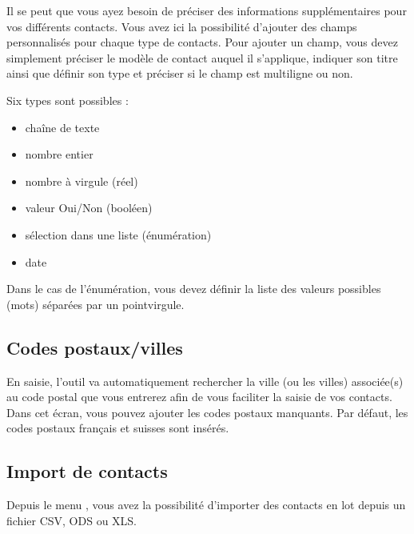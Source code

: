 \documentclass[letterpaper,10pt,french]{sphinxmanual}
\begin{document}
\sphinxAtStartPar
Il se peut que vous ayez besoin de préciser des informations supplémentaires pour vos différents contacts. Vous avez ici la possibilité d’ajouter des champs personnalisés pour chaque type de contacts. Pour ajouter un champ, vous devez simplement préciser le modèle de contact auquel il s’applique, indiquer son titre ainsi que définir son type et préciser si le champ est multiligne ou non.

\sphinxAtStartPar
Six types sont possibles :
\begin{itemize}
\item {} 
\sphinxAtStartPar
chaîne de texte

\item {} 
\sphinxAtStartPar
nombre entier

\item {} 
\sphinxAtStartPar
nombre à virgule (réel)

\item {} 
\sphinxAtStartPar
valeur Oui/Non (booléen)

\item {} 
\sphinxAtStartPar
sélection dans une liste (énumération)

\item {} 
\sphinxAtStartPar
date

\end{itemize}

\sphinxAtStartPar
Dans le cas de l’énumération, vous devez définir la liste des valeurs possibles (mots) séparées par un point\sphinxhyphen{}virgule.


\subsection{Codes postaux/villes}
\label{\detokenize{contacts/configuration:codes-postaux-villes}}
\sphinxAtStartPar
En saisie, l’outil va automatiquement rechercher la ville (ou les villes) associée(s) au code postal que vous entrerez afin de vous faciliter la saisie de vos contacts.
Dans cet écran, vous pouvez ajouter les codes postaux manquants.
Par défaut, les codes postaux français et suisses sont insérés.


\subsection{Import de contacts}
\label{\detokenize{contacts/configuration:import-de-contacts}}
\sphinxAtStartPar
Depuis le menu , vous avez la possibilité d’importer des contacts en lot depuis un fichier CSV, ODS ou XLS.
\end{document}
